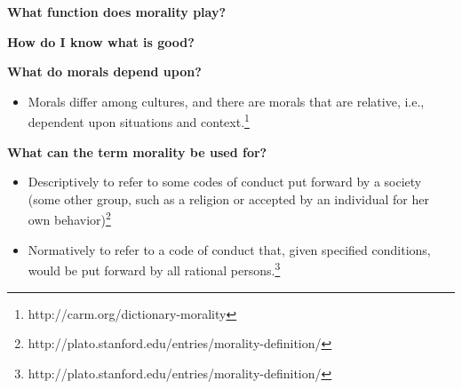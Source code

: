 \documentclass[11pt, oneside]{article}   	%
\begin{document}
\par \textbf{What function does morality play?}

\par \textbf{How do I know what is good?}

\par \textbf{What do morals depend upon?}
\begin{itemize}
	\item Morals differ among cultures, and there are morals that are relative, i.e., dependent upon situations and context.\footnote{http://carm.org/dictionary-morality}
\end{itemize}

\par \textbf{What can the term morality be used for?}
\begin{itemize}
	\item Descriptively to refer to some codes of conduct put forward by a society (some other group, such as a religion or accepted by an individual for her own behavior)\footnote{http://plato.stanford.edu/entries/morality-definition/}
	\item Normatively to refer to a code of conduct that, given specified conditions, would be put forward by all rational persons.\footnote{http://plato.stanford.edu/entries/morality-definition/}
\end{itemize}
\end{document}
